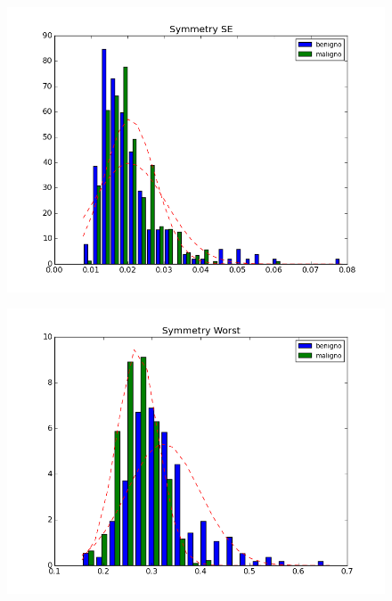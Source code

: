 \documentclass[11pt,a4paper]{article}
\numberwithin{equation}{section}
\begin{document}
\begin{itemize}
\begin{figure}[H]
\centering
\begin{minipage}{.5\textwidth}
  \centering
  \includegraphics[width=\linewidth]{../img/hist/symmetry_se}
  \label{fig:test1}
\end{minipage}%
\begin{minipage}{.5\textwidth}
  \centering
  \includegraphics[width=\linewidth]{../img/hist/symmetry_worst}
  \label{fig:test2}
\end{minipage}
\end{figure}



\end{itemize}
\end{document}
